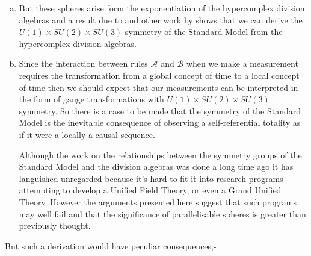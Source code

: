 \documentclass[
   ,final            %
  ]
  {aipproc}
\begin{document}
\begin{enumerate}[(1)]
\begin{enumerate}[(a)]
the parallelisable spheres. 
\item
But these spheres arise form the exponentiation of the hypercomplex division algebras and a result due to \citet{dixon_G_94,dixon_99} and other work %
by \citet{smith_t_95} shows that we can derive the $U(1)\times SU(2) \times SU(3)$ symmetry of the Standard Model from the hypercomplex division %
algebras. 
\item
Since the interaction between rules $\mathcal{A}$ and $\mathcal{B}$ when we make a measurement requires the transformation from a global concept of %
time to a local concept of time then we should expect that our measurements can be interpreted in the form of gauge transformations with $U(1)\times %
SU(2) \times SU(3)$ symmetry. So there is a case to be made that the symmetry of the Standard Model is the inevitable consequence of observing a %
self-referential totality as if it were a locally a causal sequence. 
\par
Although the work on the relationships between the symmetry groups of the Standard Model and the division algebras was done a long time ago it has %
languished unregarded because it's hard to fit it into research programs attempting to develop a Unified Field Theory, or even a Grand Unified Theory. %
However the arguments presented here suggest that such programs may well fail and that the significance of parallelisable spheres is greater than %
previously thought. 
\end{enumerate}
\end{enumerate}
\par
But such a derivation would have peculiar consequences;-
\end{document}
